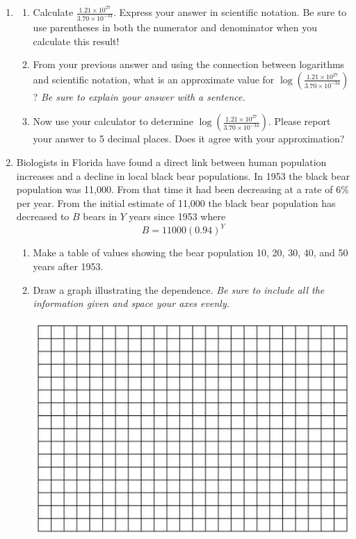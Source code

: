 \documentclass[12pt]{article}
\begin{document}
\newpage
\begin{enumerate}
\item \begin{enumerate}
\item Calculate $\displaystyle \frac{1.21 \times 10^{27}}{3.70 \times 10^{-34}} $. Express your answer in scientific notation.  Be sure to use parentheses in both the numerator and denominator when you calculate this result!
\vfill
\item From your previous answer and using the connection between logarithms and scientific notation, what is an approximate value for $\displaystyle \log \left( \frac{1.21 \times 10^{27}}{3.70 \times 10^{-34}} \right)$?  \emph{Be sure to explain your answer with a sentence.}
\vfill
\item Now use your calculator to determine  $\displaystyle \log \left(\frac{1.21 \times 10^{27}}{3.70 \times 10^{-34}}  \right)$. Please report your answer to 5 decimal places.  Does it agree with your approximation?
\vfill
\end{enumerate}
\newpage
\item Biologists in Florida have found a direct link between human population increases and a decline in local black bear populations.  In 1953 the black bear population was 11,000.  From that time it had been decreasing at a rate of 6\% per year.  From the initial estimate of 11,000 the black bear population has decreased to $B$ bears in $Y$ years since 1953 where $$B=11000(0.94)^Y$$

\begin{enumerate}
\item Make a table of values showing the bear population 10, 20, 30, 40, and 50 years after 1953.  
\vfill
\item Draw a graph illustrating the dependence.  \emph{Be sure to include all the information given and space your axes evenly.}

\vspace{.1in}
\begin{center}
 {\includegraphics [width = 6in] {../graphPaper}}
\end{center}
\vspace{.1in}


\end{enumerate}
\end{enumerate}
\end{document}
